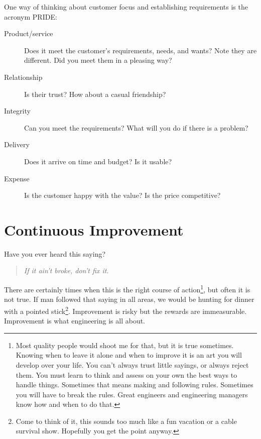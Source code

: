 One way of thinking about customer focus and establishing requirements is the acronym PRIDE:
\begin{description}
\item[Product/service] Does it meet the customer's requirements, needs, and wants?  Note they are different.  Did you meet them in a pleasing way?
\item[Relationship] Is their trust? How about a casual friendship?
\item[Integrity] Can you meet the requirements?  What will you do if there is a problem?
\item[Delivery] Does it arrive on time and budget? Is it usable?
\item[Expense] Is the customer happy with the value?  Is the price competitive?
\end{description}


\section{Continuous Improvement}
Have you ever heard this saying?
\begin{quote}
\emph{If it ain't broke, don't fix it.}
\end{quote}
There are certainly times when this is the right course of action\footnote{Most quality people would shoot me for that, but it is true sometimes.  Knowing when to leave it alone and when to improve it is an art you will develop over your life.  You can't always trust little sayings, or always reject them.  You must learn to think and assess on your own the best ways to handle things.  Sometimes that means making and following rules.  Sometimes you will have to break the rules.  Great engineers and engineering managers know how and when to do that.}, but often it is not true.  If man followed that saying in all areas, we would be hunting for dinner with a pointed stick\footnote{Come to think of it, this sounds too much like a fun vacation or a cable survival show.  Hopefully you get the point anyway.}.  Improvement is risky but the rewards are immeasurable.  Improvement is what engineering is all about.

